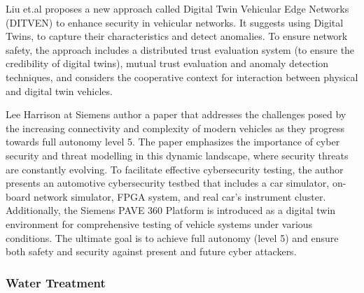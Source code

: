 Liu et.al \cite{liuDistributedCollaborativeAnomaly2021} proposes a new approach called Digital Twin Vehicular Edge Networks (DITVEN) to enhance security in vehicular networks. It suggests using Digital Twins, to capture their characteristics and detect anomalies. To ensure network safety, the approach includes a distributed trust evaluation system (to ensure the credibility of digital twins), mutual trust evaluation and anomaly detection techniques, and considers the cooperative context for interaction between physical and digital twin vehicles.

Lee Harrison \cite{harrisonCybersecurityThreatModeling2022a} at Siemens author a paper that addresses the challenges posed by the increasing connectivity and complexity of modern vehicles as they progress towards full autonomy level 5. The paper emphasizes the importance of cyber security and threat modelling in this dynamic landscape, where security threats are constantly evolving. To facilitate effective cybersecurity testing, the author presents an automotive cybersecurity testbed that includes a car simulator, on-board network simulator, FPGA system, and real car's instrument cluster. Additionally, the Siemens PAVE 360 Platform is introduced as a digital twin environment for comprehensive testing of vehicle systems under various conditions. The ultimate goal is to achieve full autonomy (level 5) and ensure both safety and security against present and future cyber attackers.

\subsubsection*{Water Treatment}

